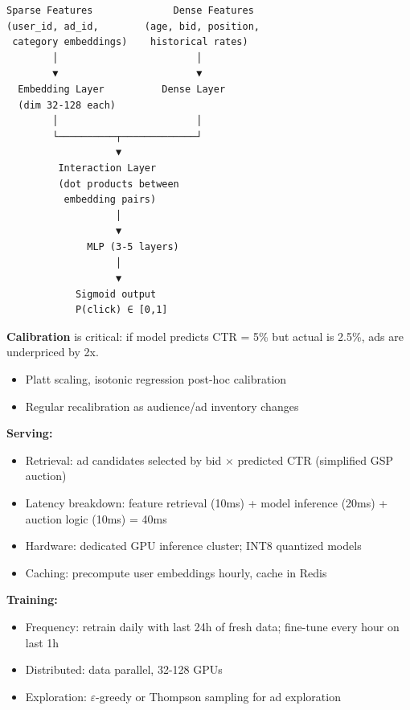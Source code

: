 \documentclass[11pt]{article}
\providecommand{\tightlist}{\setlength{\itemsep}{1pt}\setlength{\parskip}{0pt}}
\begin{document}
\setcodelang{}

\begin{verbatim}
Sparse Features              Dense Features
(user_id, ad_id,        (age, bid, position,
 category embeddings)    historical rates)
        │                        │
        ▼                        ▼
  Embedding Layer          Dense Layer
  (dim 32-128 each)
        │                        │
        └──────────┬─────────────┘
                   ▼
         Interaction Layer
         (dot products between
          embedding pairs)
                   │
                   ▼
              MLP (3-5 layers)
                   │
                   ▼
            Sigmoid output
            P(click) ∈ [0,1]
\end{verbatim}

\textbf{Calibration} is critical: if model predicts CTR = 5\% but actual is 2.5\%, ads are underpriced by 2x.

\begin{itemize}
\tightlist
\item
  Platt scaling, isotonic regression post-hoc calibration
\item
  Regular recalibration as audience/ad inventory changes
\end{itemize}

\textbf{Serving:}

\begin{itemize}
\tightlist
\item
  Retrieval: ad candidates selected by bid \(\times\) predicted CTR (simplified GSP auction)
\item
  Latency breakdown: feature retrieval (10ms) + model inference (20ms) + auction logic (10ms) = 40ms
\item
  Hardware: dedicated GPU inference cluster; INT8 quantized models
\item
  Caching: precompute user embeddings hourly, cache in Redis
\end{itemize}

\textbf{Training:}

\begin{itemize}
\tightlist
\item
  Frequency: retrain daily with last 24h of fresh data; fine-tune every hour on last 1h
\item
  Distributed: data parallel, 32-128 GPUs
\item
  Exploration: \(\varepsilon\)-greedy or Thompson sampling for ad exploration
\end{itemize}
\end{document}
